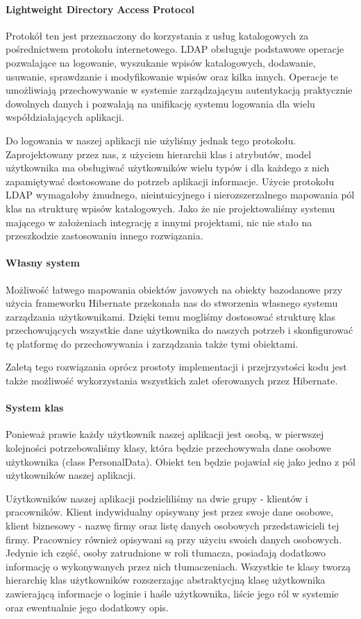 \documentclass[licencjacka]{pracamgr}
\begin{document}
\paragraph{Lightweight Directory Access Protocol}
Protokół ten jest przeznaczony do korzystania z usług katalogowych za pośrednictwem protokołu internetowego. LDAP obsługuje podstawowe operacje pozwalające na logowanie, wyszukanie wpisów katalogowych, dodawanie, usuwanie, sprawdzanie i modyfikowanie wpisów oraz kilka innych. Operacje te umożliwiają przechowywanie w systemie zarządzającym autentykacją praktycznie dowolnych danych i pozwalają na unifikację systemu logowania dla wielu współdziałających aplikacji.

Do logowania w naszej aplikacji nie użyliśmy jednak tego protokołu. Zaprojektowany przez nas, z użyciem hierarchii klas i atrybutów, model użytkownika ma obsługiwać użytkowników wielu typów i dla każdego z nich zapamiętywać dostosowane do potrzeb aplikacji informacje. Użycie protokołu LDAP wymagałoby żmudnego, nieintuicyjnego i nierozszerzalnego mapowania pól klas na strukturę wpisów katalogowych. Jako że nie projektowaliśmy systemu mającego w założeniach integrację z innymi projektami, nic nie stało na przeszkodzie zastosowaniu innego rozwiązania.

\paragraph{Własny system}
Możliwość łatwego mapowania obiektów javowych na obiekty bazodanowe przy użycia frameworku Hibernate przekonała nas do stworzenia własnego systemu zarządzania użytkownikami. Dzięki temu mogliśmy dostosować strukturę klas przechowujących wszystkie dane użytkownika do naszych potrzeb i skonfigurować tę platformę do przechowywania i zarządzania także tymi obiektami.

Zaletą tego rozwiązania oprócz prostoty implementacji i przejrzystości kodu jest także możliwość wykorzystania wszystkich zalet oferowanych przez Hibernate.

\paragraph{System klas}
Ponieważ prawie każdy użytkownik naszej aplikacji jest osobą, w pierwszej kolejności potrzebowaliśmy klasy, która będzie przechowywała dane osobowe użytkownika (class PersonalData). Obiekt ten będzie pojawiał się jako jedno z pól użytkowników naszej aplikacji.

Użytkowników naszej aplikacji podzieliliśmy na dwie grupy - klientów i pracowników. Klient indywidualny opisywany jest przez swoje dane osobowe, klient biznesowy - nazwę firmy oraz listę danych osobowych przedstawicieli tej firmy. Pracownicy również opisywani są przy użyciu swoich danych osobowych. Jedynie ich część, osoby zatrudnione w roli tłumacza, posiadają dodatkowo informację o wykonywanych przez nich tłumaczeniach.
Wszystkie te klasy tworzą hierarchię klas użytkowników rozszerzając abstraktycjną klasę użytkownika zawierającą informacje o loginie i haśle użytkownika, liście jego ról w systemie oraz ewentualnie jego dodatkowy opis.
\end{document}
